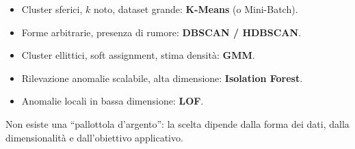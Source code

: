 \begin{defbox}
\begin{itemize}
    \item Cluster sferici, $k$ noto, dataset grande: \textbf{K-Means} (o Mini-Batch).
    \item Forme arbitrarie, presenza di rumore: \textbf{DBSCAN / HDBSCAN}.
    \item Cluster ellittici, soft assignment, stima densità: \textbf{GMM}.
    \item Rilevazione anomalie scalabile, alta dimensione: \textbf{Isolation Forest}.
    \item Anomalie locali in bassa dimensione: \textbf{LOF}.
\end{itemize}
Non esiste una ``pallottola d'argento'': la scelta dipende dalla forma dei dati, dalla dimensionalità e dall'obiettivo applicativo.
\end{defbox}
